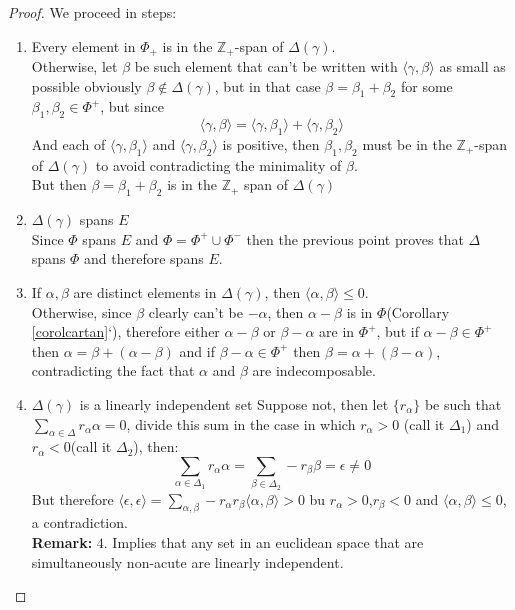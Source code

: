 \begin{proof}
We proceed in steps:
\begin{enumerate}
	\item Every element in $\Phi_+$ is in the $\mathbb{Z}_+$-span of $\Delta(\gamma)$.\\
	Otherwise, let $\beta$ be such element that can't be written with $\langle \gamma,\beta \rangle$ as small as possible obviously $\beta \not \in \Delta(\gamma)$, but in that case $\beta=\beta_1+\beta_2$ for some $\beta_1,\beta_2 \in \Phi^+$, but since $$\langle \gamma,\beta \rangle = \langle \gamma,\beta_1 \rangle + \langle \gamma,\beta_2 \rangle$$
	And each of $\langle \gamma,\beta_1 \rangle$ and $\langle \gamma,\beta_2\rangle$ is positive, then $\beta_1,\beta_2$ must be in the $\mathbb{Z}_+$-span of $\Delta(\gamma)$ to avoid contradicting the minimality of $\beta$.\\
	But then $\beta = \beta_1+\beta_2$ is in the $\mathbb{Z}_+$ span of $\Delta(\gamma)$
	\item $\Delta(\gamma)$ spans $E$\\
	Since $\Phi$ spans $E$ and $\Phi=\Phi^+\cup\Phi^-$ then the previous point proves that $\Delta$ spans $\Phi$ and therefore spans $E$.
	\item If $\alpha,\beta$ are distinct elements in $\Delta(\gamma)$, then $\langle \alpha, \beta \rangle \le 0$.\\ Otherwise, since $\beta$ clearly can't be $-\alpha$, then $\alpha-\beta$ is in $\Phi$(Corollary \ref{corolcartan}`), therefore either $\alpha-\beta$ or $\beta-\alpha$ are in $\Phi^+$, but if $\alpha-\beta \in \Phi^+$ then $\alpha = \beta + (\alpha-\beta)$ and if $\beta-\alpha \in \Phi^+$ then $\beta = \alpha + (\beta-\alpha)$, contradicting the fact that $\alpha$ and $\beta$ are indecomposable.
	\item $\Delta(\gamma)$ is a linearly independent set
	Suppose not, then let $\{r_\alpha\}$ be such that $\sum_{\alpha \in \Delta} r_\alpha \alpha = 0$, divide this sum in the case in which $r_\alpha > 0$ (call it $\Delta_1$) and $r_\alpha<0$(call it $\Delta_2$), then:
	$$\sum_{\alpha \in \Delta_1}r_\alpha \alpha = \sum_{\beta \in \Delta_2}-r_\beta \beta = \epsilon \not=0$$
	But therefore $\langle \epsilon,\epsilon\rangle=\displaystyle\sum_{\alpha,\beta} -r_\alpha r_\beta\langle \alpha,\beta\rangle > 0$ bu $r_\alpha>0$,$r_\beta <0$ and $\langle \alpha, \beta \rangle \le 0$, a contradiction.\\
	\textbf{Remark:} $4.$ Implies that any set in an euclidean space that are simultaneously non-acute are linearly independent.
\end{enumerate}
\end{proof}\\
